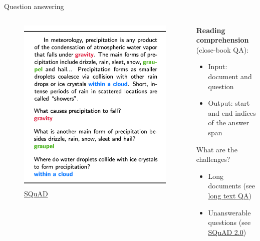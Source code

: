 \documentclass[usenames,dvipsnames,notes,11pt,aspectratio=169,hyperref={colorlinks=true, linkcolor=blue}]{beamer}
\begin{document}
\begin{frame}
    {Question answering}

    \begin{columns}
        \begin{column}{0.5\textwidth}
            \begin{figure}
                \includegraphics[height=0.7\textheight]{figures/squad}
                \caption{\href{https://arxiv.org/pdf/1606.05250.pdf}{SQuAD}}
            \end{figure}
        \end{column}
        \begin{column}{0.5\textwidth}
            \textbf{Reading comprehension} (close-book QA):\\
            \begin{itemize}
                \item[] Input: document and question
                \item[] Output: start and end indices of the answer span
            \end{itemize}

            \bigskip
            What are the challenges?\\\pause
            \begin{itemize}
                \item Long documents (see \href{https://arxiv.org/abs/2112.08608}{long text QA})
                \item Unanswerable questions (see \href{https://arxiv.org/abs/1806.03822}{SQuAD 2.0})
            \end{itemize}
        \end{column}
    \end{columns}
\end{frame}
\end{document}
